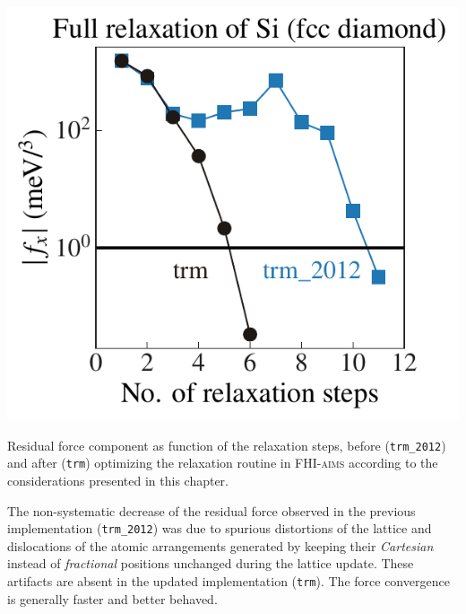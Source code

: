\begin{marginfigure}
	\includegraphics[width=\textwidth]{./data/plots/relaxation/ltrm.pdf}
	\caption{Residual force component as function of the relaxation steps, before (\texttt{trm\_2012}) and after (\texttt{trm}) optimizing the relaxation routine in \textsc{FHI-aims} according to the considerations presented in this chapter.}
	\label{fig:ltrm}
\end{marginfigure}
The non-systematic decrease of the residual force observed in the previous implementation (\texttt{trm\_2012}) was due to spurious distortions of the lattice and dislocations of the atomic arrangements generated by keeping their \emph{Cartesian} instead of \emph{fractional} positions unchanged during the lattice update. These artifacts are absent in the updated implementation (\texttt{trm}). The force convergence is generally faster and better behaved.


